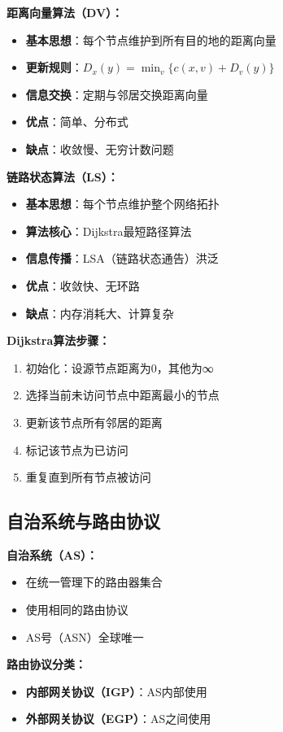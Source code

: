 \documentclass[lang=cn,newtx,10pt,scheme=chinese]{../../elegantbook}
\begin{document}
\textbf{距离向量算法（DV）：}
\begin{itemize}
  \item \textbf{基本思想}：每个节点维护到所有目的地的距离向量
  \item \textbf{更新规则}：$D_x(y) = \min_v\{c(x,v) + D_v(y)\}$
  \item \textbf{信息交换}：定期与邻居交换距离向量
  \item \textbf{优点}：简单、分布式
  \item \textbf{缺点}：收敛慢、无穷计数问题
\end{itemize}

\textbf{链路状态算法（LS）：}
\begin{itemize}
  \item \textbf{基本思想}：每个节点维护整个网络拓扑
  \item \textbf{算法核心}：Dijkstra最短路径算法
  \item \textbf{信息传播}：LSA（链路状态通告）洪泛
  \item \textbf{优点}：收敛快、无环路
  \item \textbf{缺点}：内存消耗大、计算复杂
\end{itemize}

\textbf{Dijkstra算法步骤：}
\begin{enumerate}
  \item 初始化：设源节点距离为0，其他为∞
  \item 选择当前未访问节点中距离最小的节点
  \item 更新该节点所有邻居的距离
  \item 标记该节点为已访问
  \item 重复直到所有节点被访问
\end{enumerate}

\subsection{自治系统与路由协议}

\textbf{自治系统（AS）：}
\begin{itemize}
  \item 在统一管理下的路由器集合
  \item 使用相同的路由协议
  \item AS号（ASN）全球唯一
\end{itemize}

\textbf{路由协议分类：}
\begin{itemize}
  \item \textbf{内部网关协议（IGP）}：AS内部使用
  \item \textbf{外部网关协议（EGP）}：AS之间使用
\end{itemize}
\end{document}
